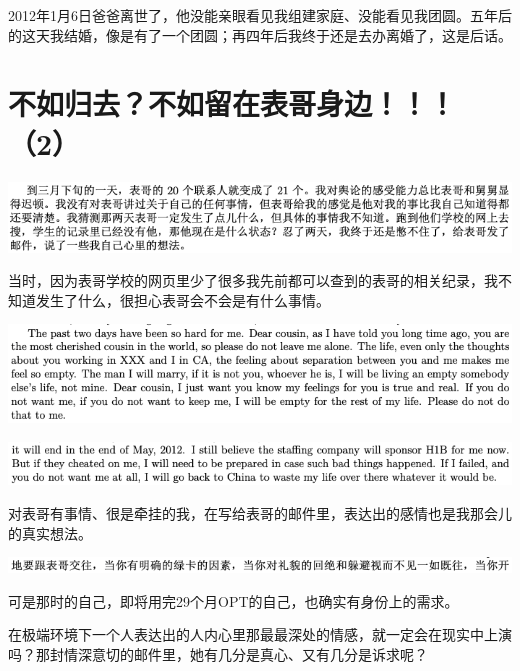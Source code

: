 \documentclass[9pt, b5paper]{article}
\begin{document}
2012年1月6日爸爸离世了，他没能亲眼看见我组建家庭、没能看见我团圆。五年后的这天我结婚，像是有了一个团圆；再四年后我终于还是去办离婚了，这是后话。 

\section{不如归去？不如留在表哥身边！！！（2）}
\label{sec:orgb170228}

\begin{center}
\includegraphics[width=.9\linewidth]{./pic/backups_plans_20210415_111452.png}
\end{center}

当时，因为表哥学校的网页里少了很多我先前都可以查到的表哥的相关纪录，我不知道发生了什么，很担心表哥会不会是有什么事情。

\begin{center}
\includegraphics[width=.9\linewidth]{./pic/backups_plans_20210415_105943.png}
\end{center}

\begin{center}
\includegraphics[width=.9\linewidth]{./pic/backups_plans_20210415_110050.png}
\end{center}

对表哥有事情、很是牵挂的我，在写给表哥的邮件里，表达出的感情也是我那会儿的真实想法。

\begin{center}
\includegraphics[width=.9\linewidth]{./pic/backups_plans_20210415_124623.png}
\end{center}

可是那时的自己，即将用完29个月OPT的自己，也确实有身份上的需求。

在极端环境下一个人表达出的人内心里那最最深处的情感，就一定会在现实中上演吗？那封情深意切的邮件里，她有几分是真心、又有几分是诉求呢？
\end{document}
